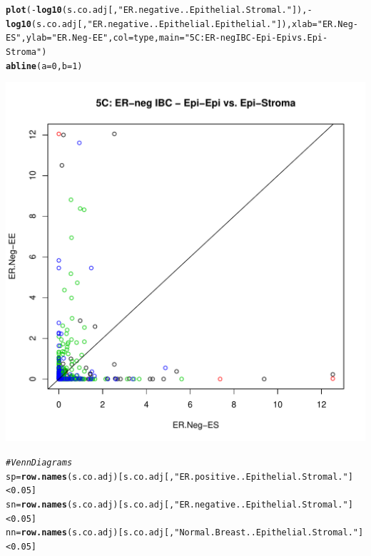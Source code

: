\documentclass{article}\usepackage[]{graphicx}\usepackage[]{color}
\makeatletter
\def\maxwidth{ %
  \ifdim\Gin@nat@width>\linewidth
    \linewidth
  \else
    \Gin@nat@width
  \fi
}
\newcommand{\hlnum}[1]{\textcolor[rgb]{0.686,0.059,0.569}{#1}}%
\newcommand{\hlstr}[1]{\textcolor[rgb]{0.192,0.494,0.8}{#1}}%
\newcommand{\hlcom}[1]{\textcolor[rgb]{0.678,0.584,0.686}{\textit{#1}}}%
\newcommand{\hlopt}[1]{\textcolor[rgb]{0,0,0}{#1}}%
\newcommand{\hlstd}[1]{\textcolor[rgb]{0.345,0.345,0.345}{#1}}%
\newcommand{\hlkwb}[1]{\textcolor[rgb]{0.69,0.353,0.396}{#1}}%
\newcommand{\hlkwc}[1]{\textcolor[rgb]{0.333,0.667,0.333}{#1}}%
\newcommand{\hlkwd}[1]{\textcolor[rgb]{0.737,0.353,0.396}{\textbf{#1}}}%
\newenvironment{kframe}{%
 \def\at@end@of@kframe{}%
 \ifinner\ifhmode%
  \def\at@end@of@kframe{\end{minipage}}%
  \begin{minipage}{\columnwidth}%
 \fi\fi%
 \def\FrameCommand##1{\hskip\@totalleftmargin \hskip-\fboxsep
 \colorbox{shadecolor}{##1}\hskip-\fboxsep
     \hskip-\linewidth \hskip-\@totalleftmargin \hskip\columnwidth}%
 \MakeFramed {\advance\hsize-\width
   \@totalleftmargin\z@ \linewidth\hsize
   \@setminipage}}%
 {\par\unskip\endMakeFramed%
 \at@end@of@kframe}
\newenvironment{knitrout}{}{} %
\makeatother
\begin{document}
\begin{knitrout}
\begin{kframe}\begin{alltt}
\hlkwd{plot}\hlstd{(}\hlopt{-}\hlkwd{log10}\hlstd{(s.co.adj[,}\hlstr{"ER.negative..Epithelial.Stromal."} \hlstd{]),}\hlopt{-}\hlkwd{log10}\hlstd{(s.co.adj[,}\hlstr{"ER.negative..Epithelial.Epithelial."}  \hlstd{]),}\hlkwc{xlab}\hlstd{=}\hlstr{"ER.Neg-ES"}\hlstd{,}\hlkwc{ylab}\hlstd{=}\hlstr{"ER.Neg-EE"}\hlstd{,}\hlkwc{col}\hlstd{=type,} \hlkwc{main} \hlstd{=} \hlstr{"5C: ER-neg IBC - Epi-Epi vs. Epi-Stroma"}\hlstd{)}
\hlkwd{abline}\hlstd{(}\hlkwc{a}\hlstd{=}\hlnum{0}\hlstd{,}\hlkwc{b}\hlstd{=}\hlnum{1}\hlstd{)}
\end{alltt}
\end{kframe}
\includegraphics[width=\maxwidth]{figure/Figure_4__Analysis_of_SANTA_Results-6} 
\begin{kframe}\begin{alltt}
\hlcom{# Venn Diagrams}
\hlstd{sp}\hlkwb{=}\hlkwd{row.names}\hlstd{(s.co.adj)[s.co.adj[,}\hlstr{"ER.positive..Epithelial.Stromal."}\hlstd{]}\hlopt{<}\hlnum{0.05}\hlstd{]}
\hlstd{sn}\hlkwb{=}\hlkwd{row.names}\hlstd{(s.co.adj)[s.co.adj[,}\hlstr{"ER.negative..Epithelial.Stromal."}\hlstd{]}\hlopt{<}\hlnum{0.05}\hlstd{]}
\hlstd{nn}\hlkwb{=}\hlkwd{row.names}\hlstd{(s.co.adj)[s.co.adj[,}\hlstr{"Normal.Breast..Epithelial.Stromal."}\hlstd{]}\hlopt{<}\hlnum{0.05}\hlstd{]}


\end{alltt}
\end{kframe}
\end{knitrout}
\end{document}
